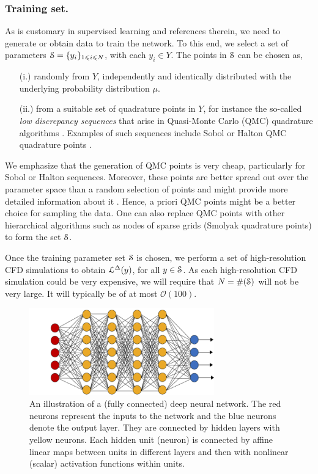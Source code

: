 \documentclass[a4paper]{article}
\numberwithin{equation}{section}
\numberwithin{equation}{section}
\theoremstyle{definition}
\theoremstyle{myremarkstyle}
\renewcommand{\leq}{\leqslant}
\newcommand{\map}{\EuScript{L}}
\newcommand{\train}{\EuScript{S}}
\begin{document}
 \subsubsection{Training set.} 
 \label{sec:training_set}
 As is customary in supervised learning \cite{DLbook} and references therein, we need to generate or obtain data to train the network. To this end, we select a set of parameters $\EuScript{S} = \{y_i\}_{1 \leq i \leq N}$, with each $y_i \in Y$. The points in $\EuScript{S}$ can be chosen as,
\begin{itemize}
\item [(i.)] randomly from $Y$, independently and identically distributed with the underlying probability distribution $\mu$. 
\item [(ii.)] from a suitable set of quadrature points in $Y$, for instance the so-called \emph{low discrepancy sequences} that arise in Quasi-Monte Carlo (QMC) quadrature algorithms \cite{CAF1}. Examples of such sequences include Sobol or Halton QMC quadrature points \cite{CAF1}.
\end{itemize}
We emphasize that the generation of QMC points is very cheap, particularly for Sobol or Halton sequences. Moreover, these points are better spread out over the parameter space than a random selection of points and might provide more detailed information about it \cite{CAF1}. Hence, a priori QMC points might be a better choice for sampling the data. One can also replace QMC points with other hierarchical algorithms such as nodes of sparse grids (Smolyak quadrature points) \cite{GRE1} to form the set $\train$.

Once the training parameter set $\train$ is chosen, we perform a set of high-resolution CFD simulations to obtain $\map^{\Delta} (y)$, for all $y \in \train$. As each high-resolution CFD simulation could be very expensive, we will require that $N = \# (\train)$ will not be very large. It will typically be of at most ${\mathcal O}(100)$. 
\begin{figure}[htbp]
\centering
\includegraphics[width=8cm]{ANN.png}
\caption{An illustration of a (fully connected) deep neural network. The red neurons represent the inputs to the network and the blue neurons denote the output layer. They are
connected by hidden layers with yellow neurons. Each hidden unit (neuron) is connected by affine linear maps between units in different layers and then with nonlinear (scalar) activation functions within units.}
\label{fig:1}
\end{figure}
\end{document}

